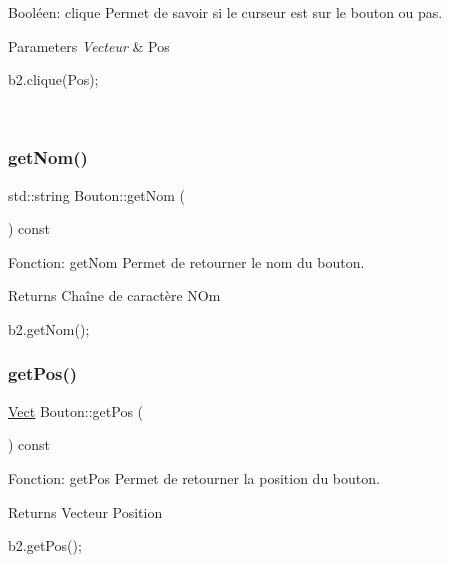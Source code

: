 Booléen\+: clique Permet de savoir si le curseur est sur le bouton ou pas. 


\begin{DoxyParams}{Parameters}
{\em Vecteur} & Pos 
\begin{DoxyCode}
b2.clique(Pos);
\end{DoxyCode}
 \\
\hline
\end{DoxyParams}
\mbox{\label{classBouton_ac7c8e0b20bd304bd82b5dbd5e9931378}} 
\subsubsection{\texorpdfstring{get\+Nom()}{getNom()}}
{\footnotesize\ttfamily std\+::string Bouton\+::get\+Nom (\begin{DoxyParamCaption}{ }\end{DoxyParamCaption}) const}



Fonction\+: get\+Nom Permet de retourner le nom du bouton. 

\begin{DoxyReturn}{Returns}
Chaîne de caractère N\+Om 
\begin{DoxyCode}
b2.getNom();
\end{DoxyCode}
 
\end{DoxyReturn}
\mbox{\label{classBouton_aed3d0897774100bd880276bd2e73db27}} 
\subsubsection{\texorpdfstring{get\+Pos()}{getPos()}}
{\footnotesize\ttfamily \hyperlink{classVect}{Vect} Bouton\+::get\+Pos (\begin{DoxyParamCaption}{ }\end{DoxyParamCaption}) const}



Fonction\+: get\+Pos Permet de retourner la position du bouton. 

\begin{DoxyReturn}{Returns}
Vecteur Position 
\begin{DoxyCode}
b2.getPos();
\end{DoxyCode}
 
\end{DoxyReturn}
\mbox{\label{classBouton_ab29ffdc7229d4d702f8dc6498ae08f20}} 

